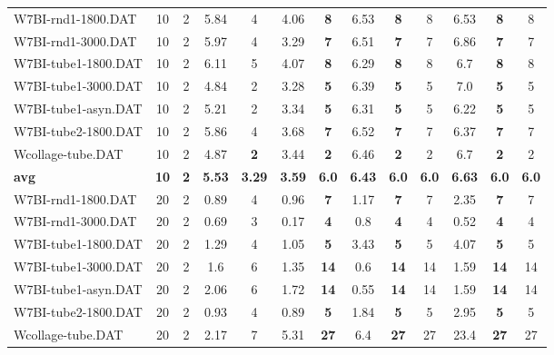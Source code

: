 \begin{table}[h]
{\begin{tabular}{lcccccccccccc}
W7BI-rnd1-1800.DAT & 10 & 2 & 5.84 & 4 &  \textcolor{blue2}{4.06} &  \textbf{8} & 6.53 &  \textbf{8} & 8 & 6.53 &  \textbf{8} & 8 \\
W7BI-rnd1-3000.DAT & 10 & 2 & 5.97 & 4 &  \textcolor{blue2}{3.29} &  \textbf{7} & 6.51 &  \textbf{7} & 7 & 6.86 &  \textbf{7} & 7 \\
W7BI-tube1-1800.DAT & 10 & 2 & 6.11 & 5 &  \textcolor{blue2}{4.07} &  \textbf{8} & 6.29 &  \textbf{8} & 8 & 6.7 &  \textbf{8} & 8 \\
W7BI-tube1-3000.DAT & 10 & 2 & 4.84 & 2 &  \textcolor{blue2}{3.28} &  \textbf{5} & 6.39 &  \textbf{5} & 5 & 7.0 &  \textbf{5} & 5 \\
W7BI-tube1-asyn.DAT & 10 & 2 & 5.21 & 2 &  \textcolor{blue2}{3.34} &  \textbf{5} & 6.31 &  \textbf{5} & 5 & 6.22 &  \textbf{5} & 5 \\
W7BI-tube2-1800.DAT & 10 & 2 & 5.86 & 4 &  \textcolor{blue2}{3.68} &  \textbf{7} & 6.52 &  \textbf{7} & 7 & 6.37 &  \textbf{7} & 7 \\
Wcollage-tube.DAT & 10 & 2 & 4.87 &  \textbf{2} &  \textcolor{blue2}{3.44} &  \textbf{2} & 6.46 &  \textbf{2} & 2 & 6.7 &  \textbf{2} & 2 \\
\cline{1-13} \textbf{avg} & \textbf{10} & \textbf{2} & \textbf{5.53} & \textbf{3.29} & \textbf{3.59} & \textbf{6.0} & \textbf{6.43} & \textbf{6.0} & \textbf{6.0} & \textbf{6.63} & \textbf{6.0} & \textbf{6.0} \\ \cline{1-13}
W7BI-rnd1-1800.DAT & 20 & 2 &  \textcolor{blue2}{0.89} & 4 & 0.96 &  \textbf{7} & 1.17 &  \textbf{7} & 7 & 2.35 &  \textbf{7} & 7 \\
W7BI-rnd1-3000.DAT & 20 & 2 & 0.69 & 3 &  \textcolor{blue2}{0.17} &  \textbf{4} & 0.8 &  \textbf{4} & 4 & 0.52 &  \textbf{4} & 4 \\
W7BI-tube1-1800.DAT & 20 & 2 & 1.29 & 4 &  \textcolor{blue2}{1.05} &  \textbf{5} & 3.43 &  \textbf{5} & 5 & 4.07 &  \textbf{5} & 5 \\
W7BI-tube1-3000.DAT & 20 & 2 & 1.6 & 6 & 1.35 &  \textbf{14} &  \textcolor{blue2}{0.6} &  \textbf{14} & 14 & 1.59 &  \textbf{14} & 14 \\
W7BI-tube1-asyn.DAT & 20 & 2 & 2.06 & 6 & 1.72 &  \textbf{14} &  \textcolor{blue2}{0.55} &  \textbf{14} & 14 & 1.59 &  \textbf{14} & 14 \\
W7BI-tube2-1800.DAT & 20 & 2 & 0.93 & 4 &  \textcolor{blue2}{0.89} &  \textbf{5} & 1.84 &  \textbf{5} & 5 & 2.95 &  \textbf{5} & 5 \\
Wcollage-tube.DAT & 20 & 2 &  \textcolor{blue2}{2.17} & 7 & 5.31 &  \textbf{27} & 6.4 &  \textbf{27} & 27 & 23.4 &  \textbf{27} & 27 \\

\end{tabular}}
\end{table}
